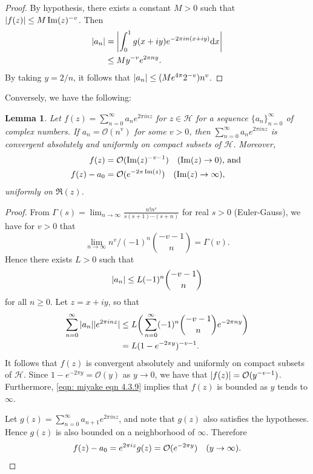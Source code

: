 \documentclass[10pt,leqno,twoside,b5paper]{article}
\theoremstyle{plain}
\newtheorem{lemma}[lem]{Lemma}
\theoremstyle{definition}
\numberwithin{equation}{section}
\numberwithin{lem}{section}
\begin{document}
\begin{proof}
    By hypothesis, there exists a constant $M>0$ such that $\abs{f(z)}\leq M\Im(z)^{-v}$. Then \begin{align*}
        \abs{a_n} &= \abs{\int_0^1 g(x+iy)e^{-2\pi i n (x+iy)}\dd x}\\
        &\leq My^{-v}e^{2\pi n y}.
    \end{align*} By taking $y = 2/n$, it follows that $\abs{a_n} \leq (Me^{4\pi}2^{-v})n^v$.
\end{proof} Conversely, we have the following:
\begin{lemma}\label{lem: miyake lem 4.3.3}
    Let $f(z) = \sum_{n=0}^\infty a_ne^{2\pi i nz}$ for $z\in \mathcal H$ for a sequence $\{a_n\}_{n=0}^\infty$ of complex numbers. If $a_n = \mathcal O(n^v)$ for some $v >0$, then $\sum_{n=0}^\infty a_ne^{2\pi i nz}$ is convergent absolutely and uniformly on compact subsets of $\mathcal H$. Moreover, 
    \begin{align*}
        f(z) &= \mathcal O(\Im(z)^{-v-1}) \quad\textup{($\Im(z) \to 0$), and }\\
        f(z) - a_0 &= \mathcal O(e^{-2\pi \Im(z)}) \quad\textup{($\Im(z) \to \infty$)},
    \end{align*}
    uniformly on $\Re(z)$.
\end{lemma}
\begin{proof}
    From $\varGamma(s) = \lim_{n\to \infty}\frac{n!n^s}{s(s+1)\cdots(s+n)}$ for real $s>0$ (Euler-Gauss), we have for $v>0$ that
    \[\lim_{n\to\infty} n^v/(-1)^n\binom{-v-1}{n} = \varGamma(v).\]
    Hence there exists $L>0$ such that 
    \[\abs{a_n}\leq L(-1)^n\binom{-v-1}{n}\] for all $n\geq 0$. Let $z = x+iy$, so that 
    \begin{align}\label{eqn: miyake eqn 4.3.9}
        \sum_{n=0}^\infty\abs{a_n}|e^{2\pi i n z}|&\leq L\bigg(\sum_{n=0}^\infty (-1)^n\binom{-v-1}{n}e^{-2\pi n y}\bigg)\\
        &= L(1-e^{-2\pi y})^{-v-1}.\nonumber
    \end{align}
    It follows that $f(z)$ is convergent absolutely and uniformly on compact subsets of $\mathcal H$. Since $1-e^{-2\pi y} = \mathcal O(y)$ as $y\to 0$, we have that $\abs{f(z)} = \mathcal O(y^{-v-1})$. Furthermore, \cref{eqn: miyake eqn 4.3.9} implies that $f(z)$ is bounded as $y$ tends to $\infty$.

    Let $g(z) = \sum_{n=0}^\infty a_{n+1}e^{2\pi i nz}$, and note that $g(z)$ also satisfies the hypotheses. Hence $g(z)$ is also bounded on a neighborhood of $\infty$. Therefore 
    \[f(z)-a_0 = e^{2\pi i z}g(z) = \mathcal O(e^{-2\pi y})\quad (y\to \infty).\qedhere\]
\end{proof}
\end{document}
